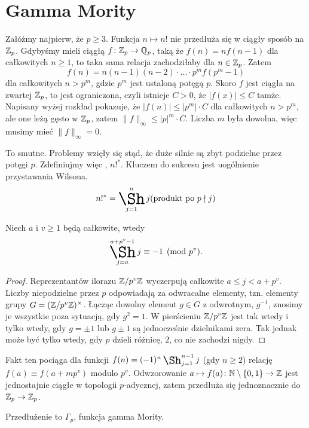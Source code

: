 \section{Gamma Mority}
Załóżmy najpierw, że $p \ge 3$.
Funkcja $n \mapsto n!$ nie przedłuża się w ciągły sposób na $\mathbb Z_p$. Gdybyśmy mieli ciągłą $f \colon \mathbb Z_p \to \mathbb Q_p$, taką że $f(n) = nf(n-1)$ dla całkowitych $n \ge 1$, to taka sama relacja zachodziłaby dla $n \in \mathbb Z_p$.
Zatem
\[
	f(n) = n (n-1)(n-2) \cdot \ldots \cdot p^m f(p^m-1)
\]
dla całkowitych $n > p^m$, gdzie $p^m$ jest ustaloną potęgą $p$.
Skoro $f$ jest ciągła na zwartej $\mathbb Z_p$, to jest ograniczona, czyli istnieje $C > 0$, że $|f(x)| \le C$ tamże.
Napisany wyżej rozkład pokazuje, że $|f(n)| \le |p^m| \cdot C$ dla całkowitych $n > p^m$, ale one leżą gęsto w $\mathbb Z_p$, zatem $\|f\|_\infty \le |p|^m \cdot C$.
Liczba $m$ była dowolna, więc musimy mieć $\|f\|_\infty = 0$.

To smutne. Problemy wzięły się stąd, że duże silnie są zbyt podzielne przez potęgi $p$.
Zdefiniujmy więc , $n!^*$.
Kluczem do sukcesu jest uogólnienie przystawania Wilsona.
\[
	n!^* = \shaprod_{j = 1}^n j \hfill \text{(produkt po } p \nmid j\textrm{)}
\]

\begin{fakt}
	Niech $a$ i $v \ge 1$ będą całkowite, wtedy
	\[
		\shaprod_{j=a}^{a+p^v-1} j \equiv -1 \pmod {p^v}.
	\]
\end{fakt}

\begin{proof}
	Reprezentantów ilorazu $\mathbb Z/p^v \mathbb Z$ wyczerpują całkowite $a \le j < a + p^v$.
	Liczby niepodzielne przez $p$ odpowiadają za odwracalne elementy, tzn. elementy grupy $G = (\mathbb Z/p^v\mathbb Z)^\times$.
	Łącząc dowolny element $g \in G$ z odwrotnym, $g^{-1}$, znosimy je wszystkie poza sytuacją, gdy $g^2 = 1$.
	W pierścieniu $\mathbb Z/p^v \mathbb Z$ jest tak wtedy i tylko wtedy, gdy $g = \pm 1$ lub $g \pm 1$ są jednocześnie dzielnikami zera.
	Tak jednak może być tylko wtedy, gdy $p$ dzieli różnicę, $2$, co nie zachodzi nigdy.
\end{proof}

Fakt ten pociąga dla funkcji $f(n) = (-1)^n \shaprod_{j=1}^{n-1} j$ (gdy $n \ge 2$) relację $f(a) \equiv f(a+mp^v)$ modulo $p^v$.
Odwzorowanie $a \mapsto f(a) \colon \mathbb N \setminus\{0,1\} \to \mathbb Z$ jest jednostajnie ciągłe w topologii $p$-adycznej, zatem przedłuża się jednoznacznie do $\mathbb Z_p \to \mathbb Z_p$.

\begin{definicja}
	Przedłużenie to $\Gamma_p$, funkcja gamma Mority.
\end{definicja}

